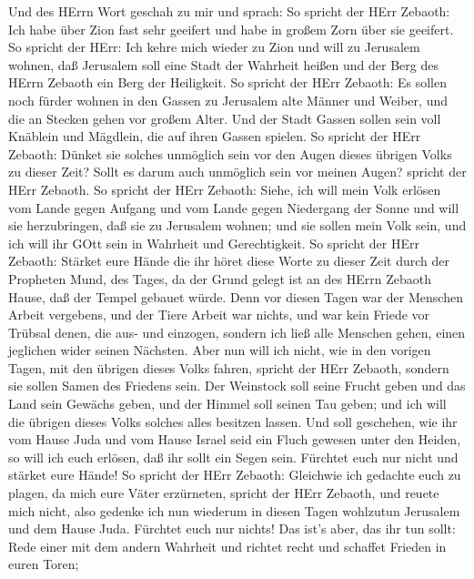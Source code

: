  Und des HErrn Wort geschah zu mir und sprach: 
So spricht der HErr Zebaoth: Ich habe über Zion fast sehr geeifert und
habe in großem Zorn über sie geeifert.  So spricht der HErr:
Ich kehre mich wieder zu Zion und will zu Jerusalem wohnen, daß
Jerusalem soll eine Stadt der Wahrheit heißen und der Berg des HErrn
Zebaoth ein Berg der Heiligkeit.  So spricht der HErr
Zebaoth: Es sollen noch fürder wohnen in den Gassen zu Jerusalem alte
Männer und Weiber, und die an Stecken gehen vor großem Alter.
 Und der Stadt Gassen sollen sein voll Knäblein und
Mägdlein, die auf ihren Gassen spielen.  So spricht der HErr
Zebaoth: Dünket sie solches unmöglich sein vor den Augen dieses übrigen
Volks zu dieser Zeit? Sollt es darum auch unmöglich sein vor meinen
Augen? spricht der HErr Zebaoth.  So spricht der HErr
Zebaoth: Siehe, ich will mein Volk erlösen vom Lande gegen Aufgang und
vom Lande gegen Niedergang der Sonne  und will sie
herzubringen, daß sie zu Jerusalem wohnen; und sie sollen mein Volk
sein, und ich will ihr GOtt sein in Wahrheit und Gerechtigkeit.
 So spricht der HErr Zebaoth: Stärket eure Hände die ihr
höret diese Worte zu dieser Zeit durch der Propheten Mund, des Tages, da
der Grund gelegt ist an des HErrn Zebaoth Hause, daß der Tempel gebauet
würde.  Denn vor diesen Tagen war der Menschen Arbeit
vergebens, und der Tiere Arbeit war nichts, und war kein Friede vor
Trübsal denen, die aus- und einzogen, sondern ich ließ alle Menschen
gehen, einen jeglichen wider seinen Nächsten.  Aber nun
will ich nicht, wie in den vorigen Tagen, mit den übrigen dieses Volks
fahren, spricht der HErr Zebaoth,  sondern sie sollen Samen
des Friedens sein. Der Weinstock soll seine Frucht geben und das Land
sein Gewächs geben, und der Himmel soll seinen Tau geben; und ich will
die übrigen dieses Volks solches alles besitzen lassen. 
Und soll geschehen, wie ihr vom Hause Juda und vom Hause Israel seid ein
Fluch gewesen unter den Heiden, so will ich euch erlösen, daß ihr sollt
ein Segen sein. Fürchtet euch nur nicht und stärket eure Hände!
 So spricht der HErr Zebaoth: Gleichwie ich gedachte euch
zu plagen, da mich eure Väter erzürneten, spricht der HErr Zebaoth, und
reuete mich nicht,  also gedenke ich nun wiederum in diesen
Tagen wohlzutun Jerusalem und dem Hause Juda. Fürchtet euch nur nichts!
 Das ist's aber, das ihr tun sollt: Rede einer mit dem
andern Wahrheit und richtet recht und schaffet Frieden in euren Toren;
